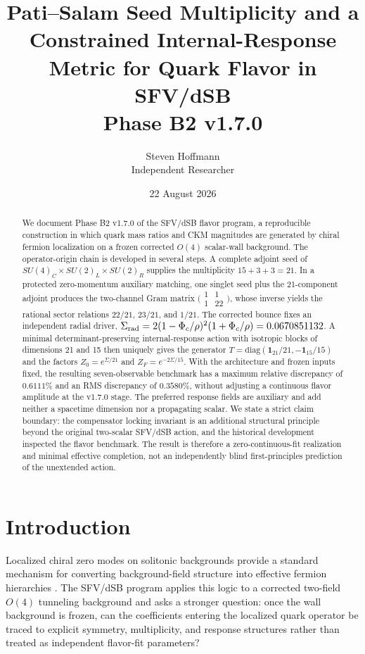 \documentclass[11pt]{article}
\title{\textbf{Pati--Salam Seed Multiplicity and a Constrained Internal-Response Metric for Quark Flavor in SFV/dSB}\\[0.4em]
\large Phase B2 v1.7.0}
\author{Steven Hoffmann\\Independent Researcher}
\date{22 August 2026}
\begin{document}
\maketitle

\begin{abstract}
We document Phase B2 v1.7.0 of the SFV/dSB flavor program, a reproducible construction in which quark mass ratios and CKM magnitudes are generated by chiral fermion localization on a frozen corrected $O(4)$ scalar-wall background. The operator-origin chain is developed in several steps. A complete adjoint seed of $SU(4)_C\times SU(2)_L\times SU(2)_R$ supplies the multiplicity $15+3+3=21$. In a protected zero-momentum auxiliary matching, one singlet seed plus the 21-component adjoint produces the two-channel Gram matrix $\bigl(\begin{smallmatrix}1&1\\1&22\end{smallmatrix}\bigr)$, whose inverse yields the rational sector relations $22/21$, $23/21$, and $1/21$. The corrected bounce fixes an independent radial driver, $\Sigma_{\rm rad}=2(1-\Phi_c/\rho)^2(1+\Phi_c/\rho)=0.0670851132$. A minimal determinant-preserving internal-response action with isotropic blocks of dimensions 21 and 15 then uniquely gives the generator $T=\mathrm{diag}(\mathbf 1_{21}/21,-\mathbf 1_{15}/15)$ and the factors $Z_0=e^{\Sigma/21}$ and $Z_F=e^{-2\Sigma/15}$. With the architecture and frozen inputs fixed, the resulting seven-observable benchmark has a maximum relative discrepancy of $0.6111\%$ and an RMS discrepancy of $0.3580\%$, without adjusting a continuous flavor amplitude at the v1.7.0 stage. The preferred response fields are auxiliary and add neither a spacetime dimension nor a propagating scalar. We state a strict claim boundary: the compensator locking invariant is an additional structural principle beyond the original two-scalar SFV/dSB action, and the historical development inspected the flavor benchmark. The result is therefore a zero-continuous-fit realization and minimal effective completion, not an independently blind first-principles prediction of the unextended action.
\end{abstract}

\section{Introduction}

Localized chiral zero modes on solitonic backgrounds provide a standard mechanism for converting background-field structure into effective fermion hierarchies \cite{JackiwRebbi1976,RubakovShaposhnikov1983}. The SFV/dSB program applies this logic to a corrected two-field $O(4)$ tunneling background and asks a stronger question: once the wall background is frozen, can the coefficients entering the localized quark operator be traced to explicit symmetry, multiplicity, and response structures rather than treated as independent flavor-fit parameters?
\end{document}
